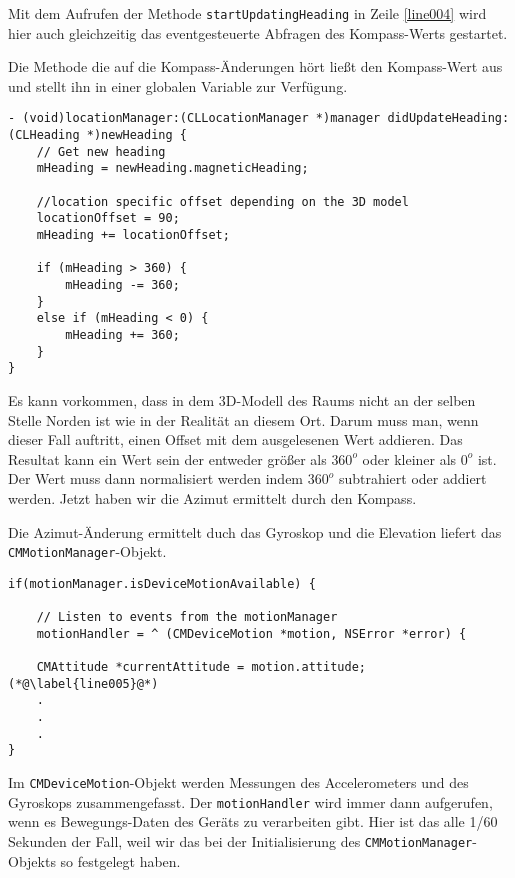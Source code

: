 Mit dem Aufrufen der Methode \texttt{startUpdatingHeading} in Zeile \ref{line004} wird hier auch gleichzeitig das eventgesteuerte Abfragen des Kompass-Werts gestartet.

Die Methode die auf die Kompass-Änderungen hört ließt den Kompass-Wert aus und stellt ihn in einer globalen Variable zur Verfügung.
~\\
\begin{lstlisting}[float=htb, caption=Azimut ermittelt durch Kompass]
- (void)locationManager:(CLLocationManager *)manager didUpdateHeading:(CLHeading *)newHeading {
	// Get new heading
	mHeading = newHeading.magneticHeading;    
    
	//location specific offset depending on the 3D model
	locationOffset = 90;
	mHeading += locationOffset;
    
	if (mHeading > 360) {
		mHeading -= 360;
	}
	else if (mHeading < 0) {
		mHeading += 360;
	}
}
\end{lstlisting}

Es kann vorkommen, dass in dem 3D-Modell des Raums nicht an der selben Stelle Norden ist wie in der Realität an diesem Ort. Darum muss man, wenn dieser Fall auftritt, einen Offset mit dem ausgelesenen Wert addieren. Das Resultat kann ein Wert sein der entweder größer als $360^o$ oder kleiner als $0^o$ ist. Der Wert muss dann normalisiert werden indem $360^o$ subtrahiert oder addiert werden. Jetzt haben wir die Azimut ermittelt durch den Kompass.

Die Azimut-Änderung ermittelt duch das Gyroskop und die Elevation liefert das \texttt{CMMotionManager}-Objekt.
~\\
\begin{lstlisting}[float=htb, caption=Bewegungsdaten auslesen \cite{apple:003}]
if(motionManager.isDeviceMotionAvailable) {
        
	// Listen to events from the motionManager
	motionHandler = ^ (CMDeviceMotion *motion, NSError *error) {
	
	CMAttitude *currentAttitude = motion.attitude;(*@\label{line005}@*)
	.
	.
	.
}
\end{lstlisting}

Im \texttt{CMDeviceMotion}-Objekt werden Messungen des Accelerometers und des Gyroskops zusammengefasst. Der \texttt{motionHandler} wird immer dann aufgerufen, wenn es Bewegungs-Daten des Geräts zu verarbeiten gibt. Hier ist das alle 1/60 Sekunden der Fall, weil wir das bei der Initialisierung des \texttt{CMMotionManager}-Objekts so festgelegt haben.

